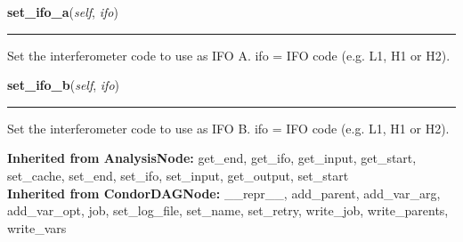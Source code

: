     \label{inspiral:IncaNode:set_ifo_a}
    \vspace{0.5ex}

    \noindent\begin{boxedminipage}{\textwidth}

    \raggedright \textbf{set\_ifo\_a}(\textit{self}, \textit{ifo})

    \vspace{-1.5ex}

    \rule{\textwidth}{0.5\fboxrule}
    Set the interferometer code to use as IFO A. ifo = IFO code (e.g. L1, 
    H1 or H2).

    \vspace{1ex}

    \end{boxedminipage}

    \label{inspiral:IncaNode:set_ifo_b}
    \vspace{0.5ex}

    \noindent\begin{boxedminipage}{\textwidth}

    \raggedright \textbf{set\_ifo\_b}(\textit{self}, \textit{ifo})

    \vspace{-1.5ex}

    \rule{\textwidth}{0.5\fboxrule}
    Set the interferometer code to use as IFO B. ifo = IFO code (e.g. L1, 
    H1 or H2).

    \vspace{1ex}

    \end{boxedminipage}

  \noindent\textbf{Inherited from AnalysisNode:}
    get\_end,
    get\_ifo,
    get\_input,
    get\_start,
    set\_cache,
    set\_end,
    set\_ifo,
    set\_input,
    get\_output,
    set\_start
    \\
  \noindent\textbf{Inherited from CondorDAGNode:}
    \_\_repr\_\_,
    add\_parent,
    add\_var\_arg,
    add\_var\_opt,
    job,
    set\_log\_file,
    set\_name,
    set\_retry,
    write\_job,
    write\_parents,
    write\_vars


